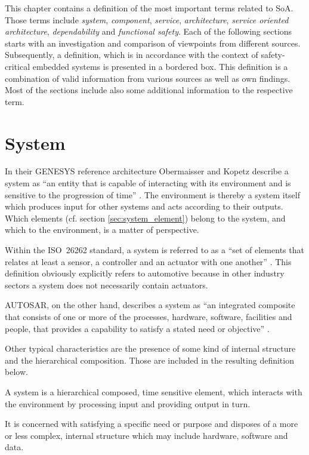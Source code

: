 \label{ch:methods}

This chapter contains a definition of the most important terms related to SoA. Those terms include \emph{system}, \emph{component}, \emph{service}, \emph{architecture}, \emph{service oriented architecture}, \emph{dependability} and \emph{functional safety}. Each of the following sections starts with an investigation and comparison of viewpoints from different sources. Subsequently, a definition, which is in accordance with the context of safety-critical embedded systems is presented in a bordered box. This definition is a combination of valid information from various sources as well as own findings. Most of the sections include also some additional information to the respective term.

\section{System}
\label{ch:system}
In their GENESYS reference architecture Obermaisser and Kopetz describe a system as ``an entity that is capable of interacting with its environment and is sensitive to the progression of time'' \cite[p.7]{genesys}. The environment is thereby a system itself which produces input for other systems and acts according to their outputs. Which elements (cf. section \ref{sec:system_element}) belong to the system, and which to the environment, is a matter of perspective. 

Within the \mbox{ISO 26262} standard, a system is referred to as a ``set of elements that relates at least a sensor, a controller and an actuator with one another'' \cite{iso26262:1}. This definition obviously explicitly refers to automotive because in other industry sectors a system does not necessarily contain actuators.

\mbox{AUTOSAR}, on the other hand, describes a system as ``an integrated composite that consists of one or more of the processes, hardware, software, facilities and people, that provides a capability to satisfy a stated need or objective'' \cite{autosar_glossary}.

Other typical characteristics are the presence of some kind of internal structure and the hierarchical composition. Those are included in the resulting definition below.

\begin{myquote}
A system is a hierarchical composed, time sensitive element, which interacts with the environment by processing input and providing output in turn.

It is concerned with satisfying a specific need or purpose and disposes of a more or less complex, internal structure which may include hardware, software and data.
\end{myquote}

